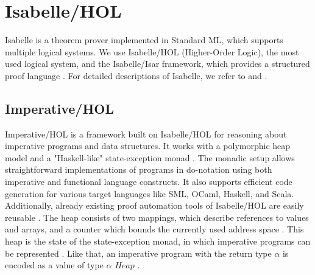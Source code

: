 \chapter{Isabelle/HOL}\label{chapter:isabelle}

Isabelle is a theorem prover implemented in Standard ML, which supports multiple logical systems. We use Isabelle/HOL (Higher-Order Logic), the most used logical system, and the Isabelle/Isar framework, which provides a structured proof language \parencite{wenzel2004isabelle}. For detailed descriptions of Isabelle, we refer to \cite{wenzel2004isabelle} and \cite{nipkow2013programming}.

\section{Imperative/HOL}\label{section:imperative_hol}

Imperative/HOL is a framework built on Isabelle/HOL for reasoning about imperative programs and data structures. It works with a polymorphic heap model and a "Haskell-like" state-exception monad \parencite{Launchbury_1995}. The monadic setup allows straightforward implementations of programs in do-notation using both imperative and functional language constructs. It also supports efficient code generation for various target languages like SML, OCaml, Haskell, and Scala. Additionally, already existing proof automation tools of Isabelle/HOL are easily reusable \parencite[p.134]{Bulwahn_2008}.
The heap consists of two mappings, which describe references to values and arrays, and a counter which bounds the currently used address space \parencite[p.140]{Bulwahn_2008}. This heap is the state of the state-exception monad, in which imperative programs can be represented \parencite[p.140 f.]{Bulwahn_2008}. Like that, an imperative program with the return type $\alpha$ is encoded as a value of type $\alpha$ $Heap$ \parencite[p.141]{Bulwahn_2008}.

